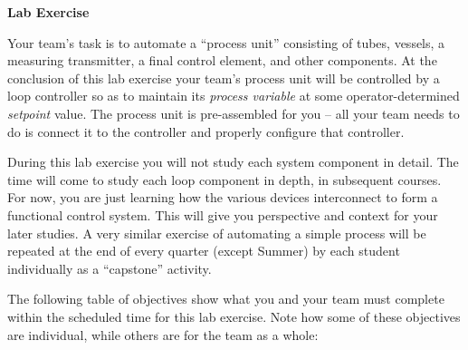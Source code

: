 

\noindent
{\bf Lab Exercise} 

\vskip 5pt

Your team's task is to automate a ``process unit'' consisting of tubes, vessels, a measuring transmitter, a final control element, and other components.  At the conclusion of this lab exercise your team's process unit will be controlled by a loop controller so as to maintain its {\it process variable} at some operator-determined {\it setpoint} value.  The process unit is pre-assembled for you -- all your team needs to do is connect it to the controller and properly configure that controller.

During this lab exercise you will not study each system component in detail.  The time will come to study each loop component in depth, in subsequent courses.  For now, you are just learning how the various devices interconnect to form a functional control system.  This will give you perspective and context for your later studies.  A very similar exercise of automating a simple process will be repeated at the end of every quarter (except Summer) by each student individually as a ``capstone'' activity.

The following table of objectives show what you and your team must complete within the scheduled time for this lab exercise.  Note how some of these objectives are individual, while others are for the team as a whole:

\vskip 10pt



